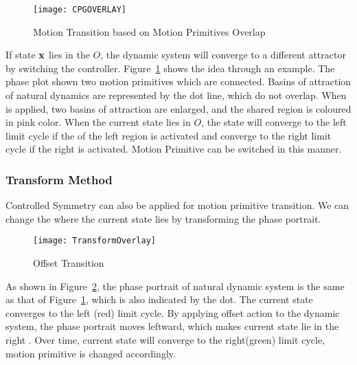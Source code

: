 \begin{figure}[!htbp]
  \begin{center}
      \texttt{[image: CPGOVERLAY]}
    \caption{ Motion Transition based on Motion Primitives Overlap}
    \label{fig:motion-overlay}
  \end{center}
\end{figure}
 
If  state $\mathbf{x}$ lies in the $O$, the dynamic system will converge to a different attractor by switching the \cpg controller.
Figure~\ref{fig:motion-overlay} shows the idea through an example.
The phase plot shown two motion primitives which are connected.
Basins of attraction of natural dynamics are represented by the dot line, which do not overlap.
When \cpg is applied, two basins of attraction are enlarged, and the shared region is coloured in pink color.
When the current state lies in $O$, the state will converge to the left limit cycle if the \cpg of the left region is activated  and converge to the right limit cycle if the right \cpg is activated.
Motion Primitive can be switched in this manner.






\subsubsection*{Transform Method}
Controlled Symmetry can also be applied for motion primitive transition.
We can change the \boa where the current state lies by transforming the phase portrait.

\begin{figure}[!htbp]
  \begin{center}
      \texttt{[image: TransformOverlay]}
    \caption{Offset Transition}
    \label{fig:transform-offset}
  \end{center}
\end{figure}




As shown in Figure~\ref{fig:transform-offset}, the phase portrait of natural dynamic system is the same as that of Figure~\ref{fig:motion-overlay}, which is also indicated by the dot.
The current state converges to the left (red) limit cycle.
By applying offset action to the dynamic system, the phase portrait  moves leftward, which makes current state lie in the right \boa.
Over time, current state will converge to the right(green) limit cycle,  motion primitive is changed accordingly.







